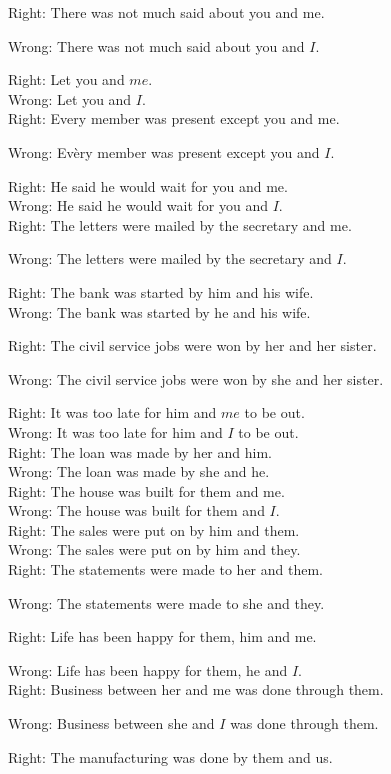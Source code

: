 \documentclass[10pt]{article}
\begin{document}
Right: There was not much said about you and me.

Wrong: There was not much said about you and $I$.

Right: Let you and $m e$.\\
Wrong: Let you and $I$.\\
Right: Every member was present except you and me.

Wrong: Evèry member was present except you and $I$.

Right: He said he would wait for you and me.\\
Wrong: He said he would wait for you and $I$.\\
Right: The letters were mailed by the secretary and me.

Wrong: The letters were mailed by the secretary and $I$.

Right: The bank was started by him and his wife.\\
Wrong: The bank was started by he and his wife.

Right: The civil service jobs were won by her and her sister.

Wrong: The civil service jobs were won by she and her sister.

Right: It was too late for him and $m e$ to be out.\\
Wrong: It was too late for him and $I$ to be out.\\
Right: The loan was made by her and him.\\
Wrong: The loan was made by she and he.\\
Right: The house was built for them and me.\\
Wrong: The house was built for them and $I$.\\
Right: The sales were put on by him and them.\\
Wrong: The sales were put on by him and they.\\
Right: The statements were made to her and them.

Wrong: The statements were made to she and they.

Right: Life has been happy for them, him and me.

Wrong: Life has been happy for them, he and $I$.\\
Right: Business between her and me was done through them.

Wrong: Business between she and $I$ was done through them.

Right: The manufacturing was done by them and us.
\end{document}
